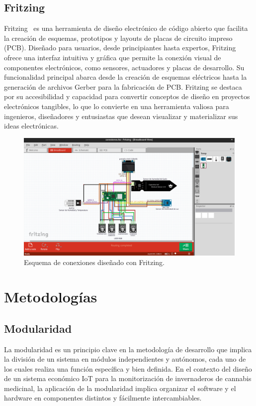 \subsection{Fritzing}
Fritzing~\cite{misc:Fritzing} es una herramienta de diseño electrónico de código abierto que facilita la creación de esquemas, prototipos y layouts de placas de circuito impreso (PCB). Diseñado para usuarios, desde principiantes hasta expertos, Fritzing ofrece una interfaz intuitiva y gráfica que permite la conexión visual de componentes electrónicos, como sensores, actuadores y placas de desarrollo. Su funcionalidad principal abarca desde la creación de esquemas eléctricos hasta la generación de archivos Gerber para la fabricación de PCB. Fritzing se destaca por su accesibilidad y capacidad para convertir conceptos de diseño en proyectos electrónicos tangibles, lo que lo convierte en una herramienta valiosa para ingenieros, diseñadores y entusiastas que desean visualizar y materializar sus ideas electrónicas.
\begin{figure}[h]
    \centering
    \includegraphics[width=1\textwidth]{img/herramientas/fritzing.png}
    \caption{Esquema de conexiones diseñado con Fritzing.}
\end{figure}
\pagebreak

\section{Metodologías}
\subsection{Modularidad}
La modularidad es un principio clave en la metodología de desarrollo que implica la división de un sistema en módulos independientes y autónomos, cada uno de los cuales realiza una función específica y bien definida. En el contexto del diseño de un sistema económico IoT para la monitorización de invernaderos de cannabis medicinal, la aplicación de la modularidad implica organizar el software y el hardware en componentes distintos y fácilmente intercambiables.

